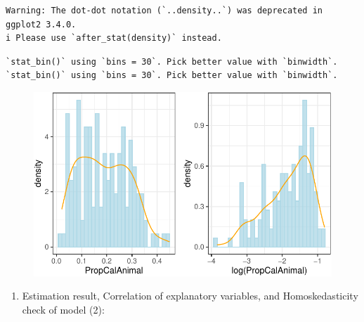 \documentclass[
  letterpaper,
  DIV=11,
  numbers=noendperiod]{scrartcl}
\providecommand{\tightlist}{%
  \setlength{\itemsep}{0pt}\setlength{\parskip}{0pt}}\usepackage{longtable,booktabs,array}
\begin{document}
\begin{verbatim}
Warning: The dot-dot notation (`..density..`) was deprecated in ggplot2 3.4.0.
i Please use `after_stat(density)` instead.
\end{verbatim}

\begin{verbatim}
`stat_bin()` using `bins = 30`. Pick better value with `binwidth`.
`stat_bin()` using `bins = 30`. Pick better value with `binwidth`.
\end{verbatim}

\begin{figure}[H]

{\centering \includegraphics{code_files/figure-pdf/unnamed-chunk-7-1.pdf}

}

\end{figure}

\begin{enumerate}
\def\labelenumi{\arabic{enumi}.}
\setcounter{enumi}{2}
\tightlist
\item
  Estimation result, Correlation of explanatory variables, and
  Homoskedasticity check of model (2):
\end{enumerate}
\end{document}
